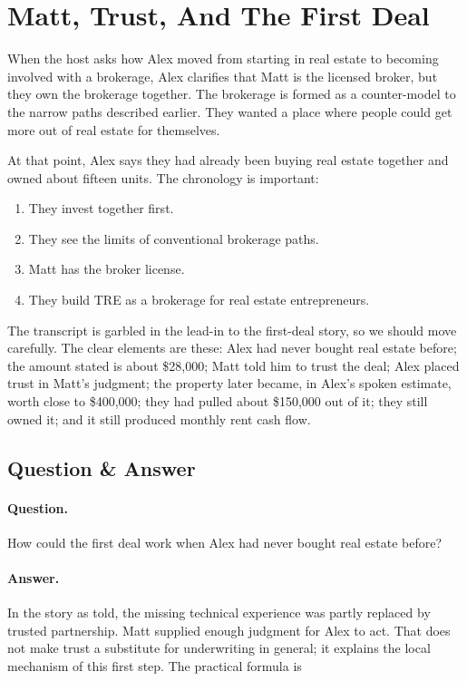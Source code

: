 \section{Matt, Trust, And The First Deal}

When the host asks how Alex moved from starting in real estate to becoming involved with a brokerage, Alex clarifies that Matt is the licensed broker, but they own the brokerage together. The brokerage is formed as a counter-model to the narrow paths described earlier. They wanted a place where people could get more out of real estate for themselves.

At that point, Alex says they had already been buying real estate together and owned about fifteen units. The chronology is important:

\begin{enumerate}
\item They invest together first.
\item They see the limits of conventional brokerage paths.
\item Matt has the broker license.
\item They build TRE as a brokerage for real estate entrepreneurs.
\end{enumerate}

The transcript is garbled in the lead-in to the first-deal story, so we should move carefully. The clear elements are these: Alex had never bought real estate before; the amount stated is about \$28,000; Matt told him to trust the deal; Alex placed trust in Matt's judgment; the property later became, in Alex's spoken estimate, worth close to \$400,000; they had pulled about \$150,000 out of it; they still owned it; and it still produced monthly rent cash flow.

\subsection{Question \& Answer}

\paragraph{Question.}
How could the first deal work when Alex had never bought real estate before?

\paragraph{Answer.}
In the story as told, the missing technical experience was partly replaced by trusted partnership. Matt supplied enough judgment for Alex to act. That does not make trust a substitute for underwriting in general; it explains the local mechanism of this first step. The practical formula is

